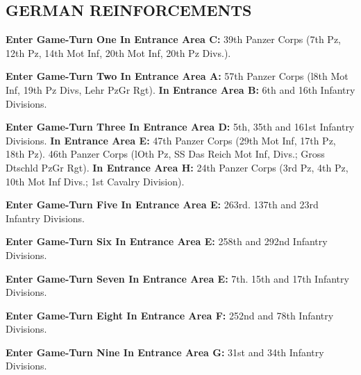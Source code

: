 \subsection{GERMAN REINFORCEMENTS}

\begin{flushleft}
  \textbf{Enter Game-Turn One In Entrance Area C:}
  \break
  39th Panzer Corps (7th Pz, 12th Pz, 14th Mot Inf,
  20th Mot Inf, 20th Pz Divs.).

  \textbf{Enter Game-Turn Two In Entrance Area A:}
  \break
  57th Panzer Corps (l8th Mot Inf, 19th Pz Divs, Lehr PzGr Rgt).
  \break
  \textbf{In Entrance Area B:}
  \break
  6th and 16th Infantry Divisions.

  \textbf{Enter Game-Turn Three In Entrance Area D:}
  \break
  5th, 35th and 161st Infantry Divisions.
  \break
  \textbf{In Entrance Area E:}
  \break
  47th Panzer Corps (29th Mot Inf, 17th Pz, 18th Pz).
  46th Panzer Corps (lOth Pz, SS Das Reich Mot Inf, Divs.; Gross Dtschld PzGr Rgt).
  \break
  \textbf{In Entrance Area H:}
  24th Panzer Corps (3rd Pz, 4th Pz, 10th Mot Inf Divs.; 1st Cavalry Division).

  \textbf{Enter Game-Turn Five In Entrance Area E:}
  \break
  263rd. 137th and 23rd Infantry Divisions.

  \textbf{Enter Game-Turn Six In Entrance Area E:}
  \break
  258th and 292nd Infantry Divisions.

  \textbf{Enter Game-Turn Seven In Entrance Area E:}
  \break
  7th. 15th and 17th Infantry Divisions.

  \textbf{Enter Game-Turn Eight In Entrance Area F:}
  \break
  252nd and 78th Infantry Divisions.

  \textbf{Enter Game-Turn Nine In Entrance Area G:}
  \break
  31st and 34th Infantry Divisions.
\end{flushleft}
\vfill